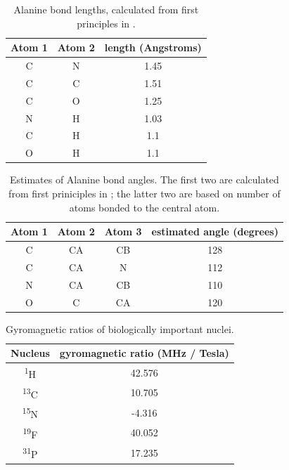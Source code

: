 \begin{table}
  \begin{tabular}{ | c | c | c | }
    \hline
    Atom 1  &   Atom 2  &  length (Angstroms)   \\  \hline
    C   &   N   &   1.45  \\  \hline
    C   &   C   &   1.51  \\  \hline
    C   &   O   &   1.25  \\  \hline
    N   &   H   &   1.03  \\  \hline
    C   &   H   &   1.1   \\  \hline
    O   &   H   &   1.1   \\  \hline
  \end{tabular}
  \caption[Alanine bond lengths, calculated from first principles.]
          {Alanine bond lengths, calculated from first principles
           in \cite{alanine_sreepad}.}
  \label{alanine_bond_lengths}
\end{table}

\begin{table}
  \begin{tabular}{ | c | c | c | c | }
    \hline
    Atom 1  &   Atom 2  &  Atom 3  &  estimated angle (degrees)   \\  \hline
    C   &   CA  &   CB  &   128  \\  \hline
    C   &   CA  &   N   &   112  \\  \hline
    N   &   CA  &   CB  &   110  \\  \hline
    O   &   C   &   CA  &   120  \\  \hline
  \end{tabular}
  \caption[Estimates of Alanine bond angles.]
          {Estimates of Alanine bond angles.  The first two are
           calculated from first priniciples in \cite{alanine_sreepad};
           the latter two are based on number of atoms bonded
           to the central atom.}
  \label{alanine_bond_angles}
\end{table}

\begin{table}
  \begin{tabular}{ | c | c | }
    \hline
    Nucleus &   gyromagnetic ratio (MHz / Tesla)  \\  \hline
    \textsuperscript{1}H    &   42.576  \\  \hline
    \textsuperscript{13}C   &   10.705  \\  \hline
    \textsuperscript{15}N   &   -4.316  \\  \hline
    \textsuperscript{19}F   &   40.052  \\  \hline
    \textsuperscript{31}P   &   17.235  \\  \hline
  \end{tabular}
  \caption{Gyromagnetic ratios of biologically important nuclei.}
  \label{gyromagnetic_ratios}
\end{table}

